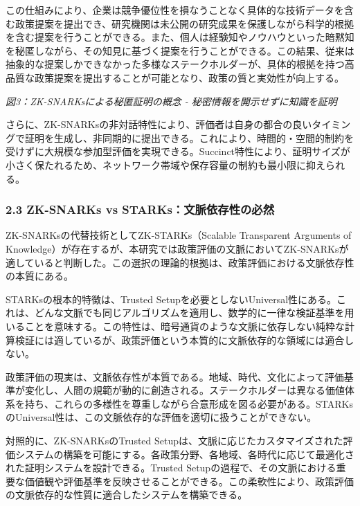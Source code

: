 この仕組みにより、企業は競争優位性を損なうことなく具体的な技術データを含む政策提案を提出でき、研究機関は未公開の研究成果を保護しながら科学的根拠を含む提案を行うことができる。また、個人は経験知やノウハウといった暗黙知を秘匿しながら、その知見に基づく提案を行うことができる。この結果、従来は抽象的な提案しかできなかった多様なステークホルダーが、具体的根拠を持つ高品質な政策提案を提出することが可能となり、政策の質と実効性が向上する。

\pandocbounded{}
\emph{図3：ZK-SNARKsによる秘匿証明の概念 - 秘密情報を開示せずに知識を証明}

さらに、ZK-SNARKsの非対話特性により、評価者は自身の都合の良いタイミングで証明を生成し、非同期的に提出できる。これにより、時間的・空間的制約を受けずに大規模な参加型評価を実現できる。Succinct特性により、証明サイズが小さく保たれるため、ネットワーク帯域や保存容量の制約も最小限に抑えられる。

\subsubsection{2.3 ZK-SNARKs vs STARKs：文脈依存性の必然}\label{zk-snarks-vs-starksux6587ux8108ux4f9dux5b58ux6027ux306eux5fc5ux7136}

ZK-SNARKsの代替技術としてZK-STARKs（Scalable Transparent Arguments of Knowledge）が存在するが、本研究では政策評価の文脈においてZK-SNARKsが適していると判断した。この選択の理論的根拠は、政策評価における文脈依存性の本質にある。

STARKsの根本的特徴は、Trusted Setupを必要としないUniversal性にある。これは、どんな文脈でも同じアルゴリズムを適用し、数学的に一律な検証基準を用いることを意味する。この特性は、暗号通貨のような文脈に依存しない純粋な計算検証には適しているが、政策評価という本質的に文脈依存的な領域には適合しない。

政策評価の現実は、文脈依存性が本質である。地域、時代、文化によって評価基準が変化し、人間の規範が動的に創造される。ステークホルダーは異なる価値体系を持ち、これらの多様性を尊重しながら合意形成を図る必要がある。STARKsのUniversal性は、この文脈依存的な評価を適切に扱うことができない。

対照的に、ZK-SNARKsのTrusted Setupは、文脈に応じたカスタマイズされた評価システムの構築を可能にする。各政策分野、各地域、各時代に応じて最適化された証明システムを設計できる。Trusted Setupの過程で、その文脈における重要な価値観や評価基準を反映させることができる。この柔軟性により、政策評価の文脈依存的な性質に適合したシステムを構築できる。

